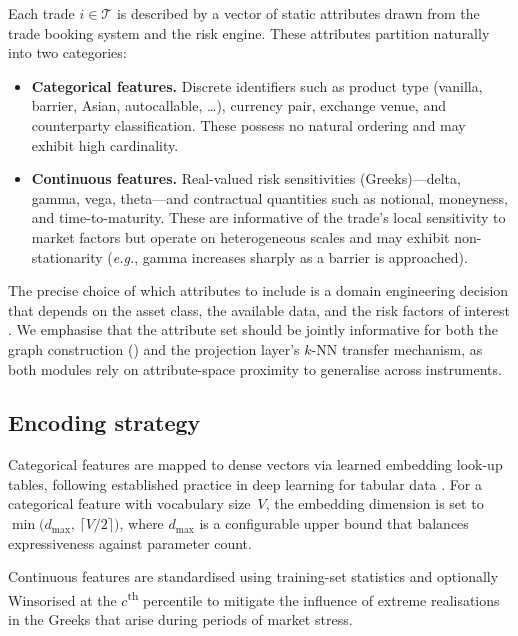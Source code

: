 \documentclass[11pt,a4paper]{article}
\newcommand{\calT}{\mathcal{T}}
\begin{document}
Each trade $i \in \calT$ is described by a vector of static attributes drawn
from the trade booking system and the risk engine.  These attributes partition
naturally into two categories:
%
\begin{itemize}[nosep]
  \item \textbf{Categorical features.}  Discrete identifiers such as product
    type (vanilla, barrier, Asian, autocallable, \ldots), currency pair,
    exchange venue, and counterparty classification.  These possess no natural
    ordering and may exhibit high cardinality.
  \item \textbf{Continuous features.}  Real-valued risk sensitivities
    (Greeks)---delta, gamma, vega, theta---and contractual quantities such as
    notional, moneyness, and time-to-maturity.  These are informative of the
    trade's local sensitivity to market factors but operate on heterogeneous
    scales and may exhibit non-stationarity (\emph{e.g.}, gamma increases
    sharply as a barrier is approached).
\end{itemize}
%
The precise choice of which attributes to include is a domain engineering
decision that depends on the asset class, the available data, and the risk
factors of interest \cite{hull2022options,glasserman2003monte}.  We emphasise
that the attribute set should be jointly informative for both the graph
construction () and the projection layer's $k$-NN transfer
mechanism, as both modules rely on attribute-space proximity to generalise
across instruments.


\subsection{Encoding strategy}\label{sec:attributes:encoding}

Categorical features are mapped to dense vectors via learned embedding
look-up tables, following established practice in deep learning for tabular
data \cite{guo2016entity,gorishniy2021revisiting}.  For a categorical feature
with vocabulary size~$V$, the embedding dimension is set to
$\min\!\bigl(d_{\max},\,\lceil V/2\rceil\bigr)$, where $d_{\max}$ is a
configurable upper bound that balances expressiveness against parameter count.

Continuous features are standardised using training-set statistics and
optionally Winsorised at the $c$\textsuperscript{th} percentile to mitigate
the influence of extreme realisations in the Greeks that arise during periods
of market stress.
\end{document}
